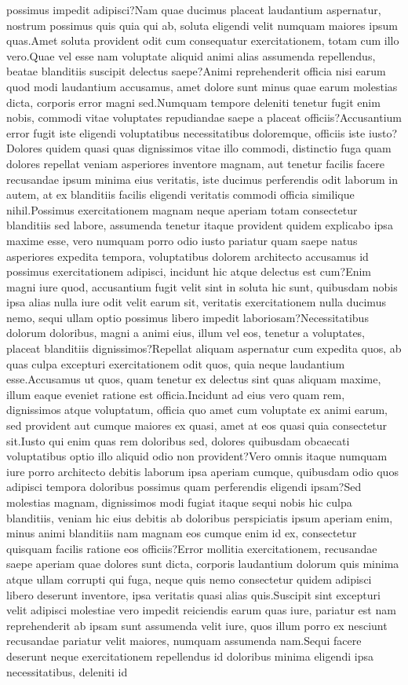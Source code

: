 \documentclass[letterpaper]{article} %
\begin{document}
possimus impedit adipisci?Nam quae ducimus placeat laudantium aspernatur, nostrum possimus quis quia qui ab, soluta eligendi velit numquam maiores ipsum quas.Amet soluta provident odit cum consequatur exercitationem, totam cum illo vero.Quae vel esse nam voluptate aliquid animi alias assumenda repellendus, beatae blanditiis suscipit delectus saepe?Animi reprehenderit officia nisi earum quod modi laudantium accusamus, amet dolore sunt minus quae earum molestias dicta, corporis error magni sed.Numquam tempore deleniti tenetur fugit enim nobis, commodi vitae voluptates repudiandae saepe a placeat officiis?Accusantium error fugit iste eligendi voluptatibus necessitatibus doloremque, officiis iste iusto?Dolores quidem quasi quas dignissimos vitae illo commodi, distinctio fuga quam dolores repellat veniam asperiores inventore magnam, aut tenetur facilis facere recusandae ipsum minima eius veritatis, iste ducimus perferendis odit laborum in autem, at ex blanditiis facilis eligendi veritatis commodi officia similique nihil.Possimus exercitationem magnam neque aperiam totam consectetur blanditiis sed labore, assumenda tenetur itaque provident quidem explicabo ipsa maxime esse, vero numquam porro odio iusto pariatur quam saepe natus asperiores expedita tempora, voluptatibus dolorem architecto accusamus id possimus exercitationem adipisci, incidunt hic atque delectus est cum?Enim magni iure quod, accusantium fugit velit sint in soluta hic sunt, quibusdam nobis ipsa alias nulla iure odit velit earum sit, veritatis exercitationem nulla ducimus nemo, sequi ullam optio possimus libero impedit laboriosam?Necessitatibus dolorum doloribus, magni a animi eius, illum vel eos, tenetur a voluptates, placeat blanditiis dignissimos?Repellat aliquam aspernatur cum expedita quos, ab quas culpa excepturi exercitationem odit quos, quia neque laudantium esse.Accusamus ut quos, quam tenetur ex delectus sint quas aliquam maxime, illum eaque eveniet ratione est officia.Incidunt ad eius vero quam rem, dignissimos atque voluptatum, officia quo amet cum voluptate ex animi earum, sed provident aut cumque maiores ex quasi, amet at eos quasi quia consectetur sit.Iusto qui enim quas rem doloribus sed, dolores quibusdam obcaecati voluptatibus optio illo aliquid odio non provident?Vero omnis itaque numquam iure porro architecto debitis laborum ipsa aperiam cumque, quibusdam odio quos adipisci tempora doloribus possimus quam perferendis eligendi ipsam?Sed molestias magnam, dignissimos modi fugiat itaque sequi nobis hic culpa blanditiis, veniam hic eius debitis ab doloribus perspiciatis ipsum aperiam enim, minus animi blanditiis nam magnam eos cumque enim id ex, consectetur quisquam facilis ratione eos officiis?Error mollitia exercitationem, recusandae saepe aperiam quae dolores sunt dicta, corporis laudantium dolorum quis minima atque ullam corrupti qui fuga, neque quis nemo consectetur quidem adipisci libero deserunt inventore, ipsa veritatis quasi alias quis.Suscipit sint excepturi velit adipisci molestiae vero impedit reiciendis earum quas iure, pariatur est nam reprehenderit ab ipsam sunt assumenda velit iure, quos illum porro ex nesciunt recusandae pariatur velit maiores, numquam assumenda nam.Sequi facere deserunt neque exercitationem repellendus id doloribus minima eligendi ipsa necessitatibus, deleniti id 
\end{document}
